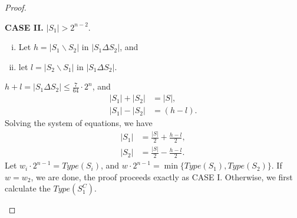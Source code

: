 \documentclass[12pt]{ucthesis}
\theoremstyle{plain}
\theoremstyle{definition}
\begin{document}
\begin{proof}
\begin{enumerate}[(1)]
	\textbf{CASE II.} $|S_1| > 2^{n - 2}$.
	\begin{enumerate}[(i)]
	\item Let $h = |S_1 \backslash S_2|$ in $|S_1 \Delta S_2|$, and
	\item let $l = |S_2 \backslash S_1|$ in $|S_1 \Delta S_2|$.
	\end{enumerate}
	$h + l = |S_1 \Delta S_2| \le \frac{7}{64} \cdot 2^n$, and
	\begin{align*}
	|S_1| + |S_2| & = |S|, \\
	|S_1| - |S_2| & = (h - l).
	\end{align*}
	Solving the system of equations, we have
	\begin{align*}
	|S_1| & = \frac{|S|}{2} + \frac{h - l}{2}, \\
	|S_2| & = \frac{|S|}{2} - \frac{h - l}{2}.
	\end{align*}
	Let $w_i \cdot 2^{n - 1} = Type(S_i)$,
	and $w \cdot 2^{n - 1} = \min\{Type(S_1), Type(S_2)\}$.
	If $w = w_2$, we are done, the proof proceeds exactly as CASE I.
	Otherwise, we first calculate the $Type(S_1^C)$.


\end{enumerate}
\end{proof}
\end{document}
